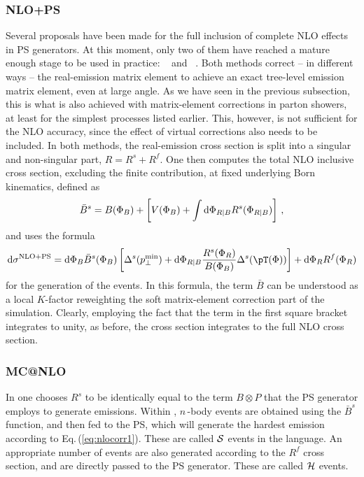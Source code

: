 \subsubsection{NLO+PS}
\label{nlops}
Several proposals have been made for the full inclusion of complete NLO 
effects in PS generators. At this moment, only two of them have reached a
mature enough stage to be used in practice: \MCatNLO~\cite{Frixione:2002ik} and 
\POWHEG~\cite{Nason:2004rx}.  Both methods correct -- in different ways -- 
the real-emission matrix element to achieve an exact tree-level emission 
matrix element, even at large angle.  As we have seen in the previous 
subsection, this is what is also achieved with matrix-element corrections in 
parton showers, at least for the simplest processes listed earlier.  This, 
however, is not sufficient for the NLO accuracy, since the effect of 
virtual corrections also needs to be included.  In both methods, the real-emission 
cross section is split into a singular and non-singular part,
$R=R^{s}+R^{f}$.  One then computes the total NLO inclusive cross 
section, excluding the finite contribution, at fixed underlying Born 
kinematics, defined as
\begin{equation}\label{eq:nlocorr1}
\bar{B}^{s}=B(\Phi_B)+\left[V(\Phi_B)+
\int{\rm d}\Phi_{R|B} R^{s}(\Phi_{R|B})\right]\,,
\end{equation}
and uses the formula
\begin{equation}
\label{Eq:Powheg}
{\rm d}\sigma^{\rm NLO+PS} =
{\rm d}\Phi_B\bar B^{s}(\Phi_B)
\left[\Delta^s(\pperpmin) 
  +  {\rm d}\Phi_{R|B}
      \frac{R^{s}(\Phi_R)}{B(\Phi_B)}
      \Delta^s(\pT(\Phi))\right] 
+ {\rm d}\Phi_R R^{f}(\Phi_R)
\end{equation}
for the generation of the events.  In this formula, the term $\bar B$ can be 
understood as a local $K$-factor reweighting the soft matrix-element 
correction part of the simulation.  Clearly, employing the fact that 
the term in the first square bracket integrates to unity, as before, the 
cross section integrates to the full NLO cross section.  

\subsubsection{ MC@NLO}
\label{mcatnlo}
In \MCatNLO one chooses $R^s$ to be identically equal to the term $B\otimes P$
that the PS generator employs to generate emissions.  Within \MCatNLO,
$n\,$-body events are obtained using the $\bar{B}^s$ function, and then fed to 
the PS, which will generate the hardest emission according to 
Eq.\,(\ref{eq:nlocorr1}).  These are called ${\cal S}$ events in the \MCatNLO 
language. An appropriate number of events are also generated according to
the $R^f$  cross section, and are directly passed to the PS generator.
These are  called ${\cal H}$ events.

